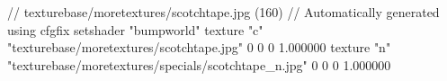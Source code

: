 // texturebase/moretextures/scotchtape.jpg (160)
// Automatically generated using cfgfix
setshader "bumpworld"
texture "c" "texturebase/moretextures/scotchtape.jpg" 0 0 0 1.000000
texture "n" "texturebase/moretextures/specials/scotchtape_n.jpg" 0 0 0 1.000000
